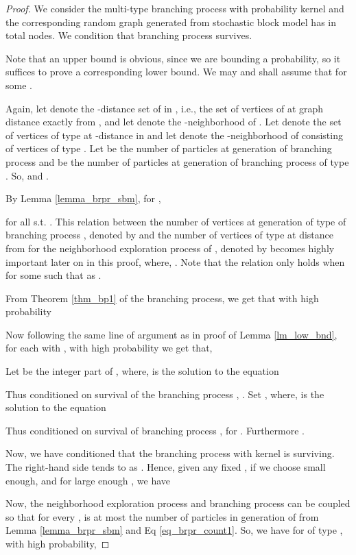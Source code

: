 \documentclass[graybox]{svmult}
\begin{document}
\begin{proof}
We consider the multi-type branching process with probability kernel   and the corresponding random graph  generated from stochastic block model has in total  nodes. We condition that branching process  survives.

Note that an upper bound  is obvious, since we are bounding a probability, so it suffices to prove a corresponding lower bound. We may and shall assume that  for some  . 

Again, let  denote the -distance set of  in , i.e., the set of vertices of  at graph distance exactly  from , and let  denote the -neighborhood  of . Let  denote the set of vertices of type  at -distance in  and let  denote the -neighborhood  of  consisting of vertices of type . Let  be the number of particles at generation  of branching process  and  be the number of particles at generation  of branching process  of type . So,  and .

By Lemma \ref{lemma_brpr_sbm}, for ,

for all  s.t. . This relation between the number of vertices at generation  of type  of branching process , denoted by  and the number of vertices of type  at distance  from  for the neighborhood exploration process of , denoted by  becomes highly important later on in this proof, where, . Note that the relation only holds when  for some  such that  as .





From Theorem \ref{thm_bp1} of the branching process, we get that with high probability



Now following the same line of argument as in proof of Lemma \ref{lm_low_bnd}, for each  with , with high probability we get that,


Let  be the integer part of , where,  is the solution to the equation

Thus conditioned on survival of the branching process , . 
Set , where,  is the solution to the equation

Thus conditioned on survival of branching process ,  for .
Furthermore .


Now, we have conditioned that the branching process with kernel  is surviving. The right-hand side tends to  as . Hence, given any fixed , if we choose  small enough, and for large enough , we have


Now, the neighborhood exploration process and branching process can be coupled so that for every ,  is at most the number  of particles in generation  of  from Lemma \ref{lemma_brpr_sbm} and Eq \eqref{eq_brpr_count1}. So, we have for  of type , with high probability,


\end{proof}
\end{document}
